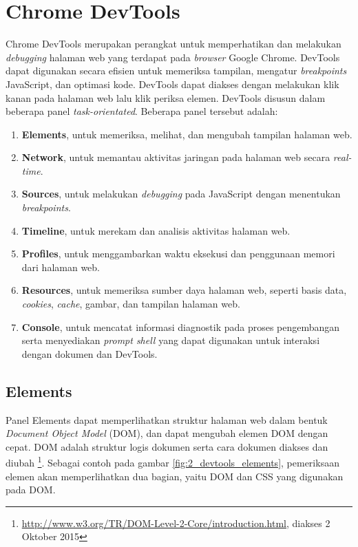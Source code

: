 \section{Chrome DevTools}
\label{sec:devtools}
Chrome DevTools\cite{devtools} merupakan perangkat untuk memperhatikan dan melakukan \textit{debugging} halaman web yang terdapat pada \textit{browser} Google Chrome. DevTools dapat digunakan secara efisien untuk memeriksa tampilan, mengatur \textit{breakpoints} JavaScript, dan optimasi kode. DevTools dapat diakses dengan melakukan klik kanan pada halaman web lalu klik periksa elemen. DevTools disusun dalam beberapa panel \textit{task-orientated}. Beberapa panel tersebut adalah:

\begin{enumerate}
	\item \textbf{Elements}, untuk memeriksa, melihat, dan mengubah tampilan halaman web.
	\item \textbf{Network}, untuk memantau aktivitas jaringan pada halaman web secara \textit{real-time}.
	\item \textbf{Sources}, untuk melakukan \textit{debugging} pada JavaScript dengan menentukan \textit{breakpoints}.
	\item \textbf{Timeline}, untuk merekam dan analisis aktivitas halaman web.
	\item \textbf{Profiles}, untuk menggambarkan waktu eksekusi dan penggunaan memori dari halaman web.
	\item \textbf{Resources}, untuk memeriksa sumber daya halaman web, seperti basis data, \textit{cookies}, \textit{cache}, gambar, dan tampilan halaman web.
	\item \textbf{Console}, untuk mencatat informasi diagnostik pada proses pengembangan serta menyediakan \textit{prompt shell} yang dapat digunakan untuk interaksi dengan dokumen dan DevTools.
\end{enumerate}

\subsection{Elements}
Panel Elements dapat memperlihatkan struktur halaman web dalam bentuk \textit{Document Object Model} (DOM), dan dapat mengubah elemen DOM dengan cepat. DOM adalah struktur logis dokumen serta cara dokumen diakses dan diubah \footnote{\url{http://www.w3.org/TR/DOM-Level-2-Core/introduction.html}, diakses 2 Oktober 2015}. Sebagai contoh pada gambar \ref{fig:2_devtools_elements}, pemeriksaan elemen akan memperlihatkan dua bagian, yaitu DOM dan CSS yang digunakan pada DOM.

